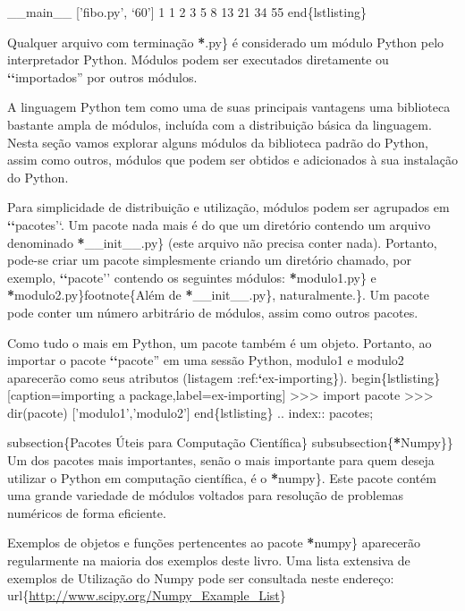 \documentclass[a4paper,10pt,brazil]{sphinxmanual}
\begin{document}
\_\_main\_\_
{[}'fibo.py', `60'{]}
1 1 2 3 5 8 13 21 34 55
end\{lstlisting\}

Qualquer arquivo com terminação  {\color{red}\bfseries{}*}.py\} é considerado um módulo Python pelo interpretador Python. Módulos podem ser executados diretamente ou {\color{red}\bfseries{}{}`{}`}importados'' por outros módulos.

A linguagem Python tem como uma de suas principais vantagens uma biblioteca bastante ampla de módulos, incluída com a distribuição básica da linguagem. Nesta seção vamos explorar alguns módulos da biblioteca padrão do Python, assim como outros, módulos que podem ser obtidos e adicionados à sua instalação do Python.

Para simplicidade de distribuição e utilização, módulos podem ser agrupados em {\color{red}\bfseries{}{}`{}`}pacotes'`. Um pacote nada mais é do que um diretório contendo um arquivo denominado {\color{red}\bfseries{}*}\_\_init\_\_.py\} (este arquivo não precisa conter nada). Portanto, pode-se criar um pacote simplesmente criando um diretório chamado, por exemplo, {\color{red}\bfseries{}{}`{}`}pacote'' contendo os seguintes módulos: {\color{red}\bfseries{}*}modulo1.py\} e {\color{red}\bfseries{}*}modulo2.py\}footnote\{Além de {\color{red}\bfseries{}*}\_\_init\_\_.py\}, naturalmente.\}. Um pacote pode conter um número arbitrário de módulos, assim como outros pacotes.

Como tudo o mais em Python, um pacote também é um objeto. Portanto, ao importar o pacote {\color{red}\bfseries{}{}`{}`}pacote'' em uma sessão Python, modulo1 e modulo2 aparecerão como seus atributos (listagem :ref:{\color{red}\bfseries{}{}`}ex-importing\}).
begin\{lstlisting\}{[}caption=importing a package,label=ex-importing{]}
\textgreater{}\textgreater{}\textgreater{} import pacote
\textgreater{}\textgreater{}\textgreater{} dir(pacote)
{[}'modulo1','modulo2'{]}
end\{lstlisting\}
.. index:: pacotes;

subsection\{Pacotes Úteis para Computação Científica\}
subsubsection\{{\color{red}\bfseries{}*}Numpy\}\}
Um dos pacotes mais importantes, senão o mais importante para quem deseja utilizar o Python em computação científica, é o {\color{red}\bfseries{}*}numpy\}. Este pacote contém uma grande variedade de módulos voltados para resolução de problemas numéricos de forma eficiente.

Exemplos de objetos e funções pertencentes ao pacote {\color{red}\bfseries{}*}numpy\} aparecerão regularmente na maioria dos exemplos deste livro. Uma lista extensiva de exemplos de Utilização do Numpy pode ser consultada neste endereço: url\{\href{http://www.scipy.org/Numpy\_Example\_List}{http://www.scipy.org/Numpy\_Example\_List}\}
\end{document}
